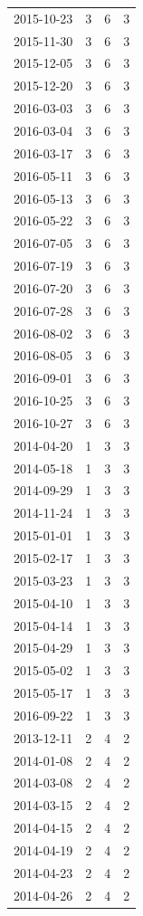 \begin{tabular}{lrrr}
2015-10-23 & 3 & 6 & 3 \\
2015-11-30 & 3 & 6 & 3 \\
2015-12-05 & 3 & 6 & 3 \\
2015-12-20 & 3 & 6 & 3 \\
2016-03-03 & 3 & 6 & 3 \\
2016-03-04 & 3 & 6 & 3 \\
2016-03-17 & 3 & 6 & 3 \\
2016-05-11 & 3 & 6 & 3 \\
2016-05-13 & 3 & 6 & 3 \\
2016-05-22 & 3 & 6 & 3 \\
2016-07-05 & 3 & 6 & 3 \\
2016-07-19 & 3 & 6 & 3 \\
2016-07-20 & 3 & 6 & 3 \\
2016-07-28 & 3 & 6 & 3 \\
2016-08-02 & 3 & 6 & 3 \\
2016-08-05 & 3 & 6 & 3 \\
2016-09-01 & 3 & 6 & 3 \\
2016-10-25 & 3 & 6 & 3 \\
2016-10-27 & 3 & 6 & 3 \\
2014-04-20 & 1 & 3 & 3 \\
2014-05-18 & 1 & 3 & 3 \\
2014-09-29 & 1 & 3 & 3 \\
2014-11-24 & 1 & 3 & 3 \\
2015-01-01 & 1 & 3 & 3 \\
2015-02-17 & 1 & 3 & 3 \\
2015-03-23 & 1 & 3 & 3 \\
2015-04-10 & 1 & 3 & 3 \\
2015-04-14 & 1 & 3 & 3 \\
2015-04-29 & 1 & 3 & 3 \\
2015-05-02 & 1 & 3 & 3 \\
2015-05-17 & 1 & 3 & 3 \\
2016-09-22 & 1 & 3 & 3 \\
2013-12-11 & 2 & 4 & 2 \\
2014-01-08 & 2 & 4 & 2 \\
2014-03-08 & 2 & 4 & 2 \\
2014-03-15 & 2 & 4 & 2 \\
2014-04-15 & 2 & 4 & 2 \\
2014-04-19 & 2 & 4 & 2 \\
2014-04-23 & 2 & 4 & 2 \\
2014-04-26 & 2 & 4 & 2 \\

\end{tabular}
